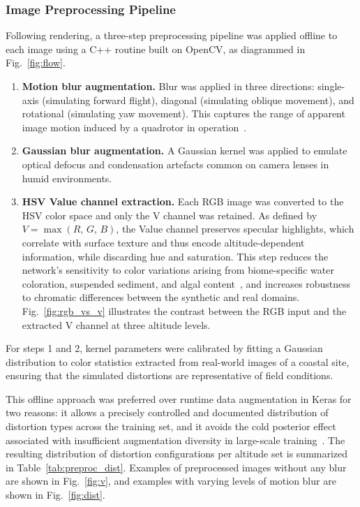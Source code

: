 \subsubsection{Image Preprocessing Pipeline}
\label{subsubsec:synth_preproc}

Following rendering, a three-step preprocessing pipeline was applied offline
to each image using a C++ routine built on OpenCV, as diagrammed in
Fig.~\ref{fig:flow}.

\begin{enumerate}

    \item \textbf{Motion blur augmentation.} Blur was applied in three
    directions: single-axis (simulating forward flight), diagonal (simulating
    oblique movement), and rotational (simulating yaw movement). This captures
    the range of apparent image motion induced by a quadrotor in
    operation~\cite{YawBlur,MotionBlur,SynthBlurDeblur}.

    \item \textbf{Gaussian blur augmentation.} A Gaussian kernel was applied
    to emulate optical defocus and condensation artefacts common on camera
    lenses in humid environments.

    \item \textbf{HSV Value channel extraction.} Each RGB image was converted
    to the HSV color space and only the V channel was retained. As defined by
    $V = \max(R,\,G,\,B)$, the Value channel preserves specular highlights,
    which correlate with surface texture and thus encode altitude-dependent
    information, while discarding hue and saturation. This step reduces the
    network's sensitivity to color variations arising from biome-specific
    water coloration, suspended sediment, and algal content~\cite{ColorTurb},
    and increases robustness to chromatic differences between the synthetic
    and real domains. Fig.~\ref{fig:rgb_vs_v} illustrates the contrast between
    the RGB input and the extracted V channel at three altitude levels.

\end{enumerate}

For steps 1 and 2, kernel parameters were calibrated by fitting a Gaussian distribution to color statistics extracted from real-world images of a coastal site, ensuring that the simulated distortions are representative of field conditions.

This offline approach was preferred over runtime data augmentation in Keras for two reasons: it allows a precisely controlled and documented distribution of distortion types across the training set, and it avoids the cold posterior effect associated with insufficient augmentation diversity in large-scale training~\cite{BadData}. The resulting distribution of distortion configurations per altitude set is summarized in Table~\ref{tab:preproc_dist}. Examples of preprocessed images without any blur are shown in Fig.~\ref{fig:v}, and examples with varying levels of motion blur are shown in Fig.~\ref{fig:dist}.

